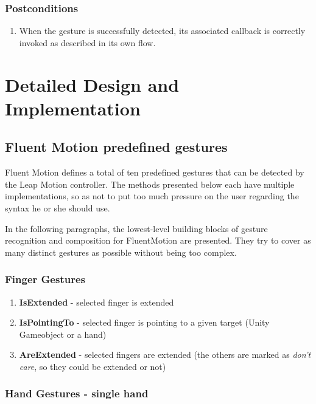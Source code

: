 \documentclass[12pt,a4paper,twoside]{report}
\begin{document}
\subsection{Postconditions}

\begin{enumerate}
  \item When the gesture is successfully detected, its associated callback is correctly invoked as described in its own flow.
\end{enumerate}

\chapter{Detailed Design and Implementation}

\section{Fluent Motion predefined gestures}

Fluent Motion defines a total of ten predefined gestures that can be detected by the Leap Motion controller. The methods presented below each have multiple implementations, so as not to put too much pressure on the user regarding the syntax he or she should use.

In the following paragraphs, the lowest-level building blocks of gesture recognition and composition for FluentMotion are presented. They try to cover as many distinct gestures as possible without being too complex.

\subsection{Finger Gestures}
\begin{enumerate}
  \item \textbf{IsExtended} - selected finger is extended
  \item \textbf{IsPointingTo} - selected finger is pointing to a given target (Unity Gameobject or a hand)
  \item \textbf{AreExtended} - selected fingers are extended (the others are marked as \textit{don't care}, so they could be extended or not)
\end{enumerate}

\subsection{Hand Gestures - single hand}
\end{document}
